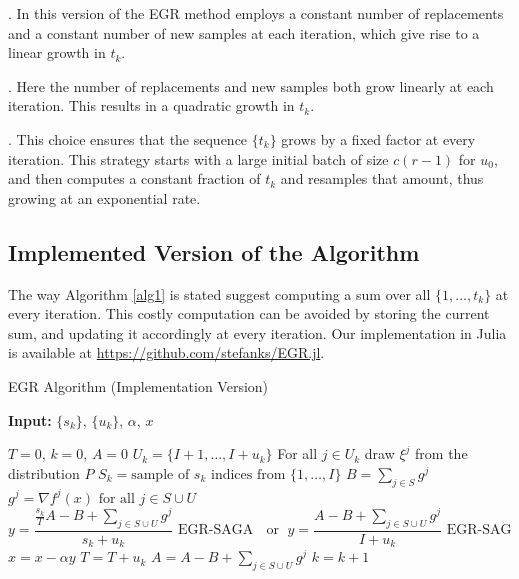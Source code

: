 \documentclass[11pt]{article}
\begin{document}
\medskip{}. In this version of the EGR method employs a constant number of replacements and a constant number of new samples at each iteration, which give rise to a linear growth in $t_k$.

\medskip{}. Here the number of replacements and new samples both grow linearly at each iteration. This results in a  quadratic growth in $t_k$.

\medskip{}. This choice ensures that the sequence $\{ t_k \}$ grows by a fixed factor at every iteration. This strategy starts with a large initial batch of size $c(r-1)$ for $u_0$, and then computes a constant fraction of $t_k$ and resamples that amount, thus growing at an exponential rate. 
 
\subsection{Implemented Version of the Algorithm}

The way Algorithm \ref{alg1} is stated suggest computing a sum over all $\{1, \ldots ,t_k \} $ at every iteration. This costly computation can be avoided by storing the current sum, and updating it accordingly at every iteration. Our implementation in Julia is available at \url{https://github.com/stefanks/EGR.jl}.

  \bigskip
  \begin{algorithm}
  	[H] 
  	\caption{EGR Algorithm (Implementation Version)}
  	\label{alg1-IMP}
  	{\bf Input:} $\{ s_k\} $, $\{ u_k \}$, $\alpha$, $x$
  	\begin{algorithmic}
  		[1] 
  		\State $T= 0$, $k = 0$, $A = 0$
  		\Loop 
  		\State $U_k =\{I+1,\ldots, I+u_k \}$ 
  		\State For  all $j \in U_k$ draw $\xi^j$ from the distribution $P$ 
  		\State $S_k = \mbox{sample of } s_k \mbox{ indices from }\{ 1, \ldots ,I\}$ 
  		\State $B = \sum_{j \in S} g^j$ 
  		\State $g^j =  \nabla f^j(x) \mbox{ for all } j \in S\cup U$ 
  		\State 
  		\begin{equation}
  			y =  \frac{\frac{s_k}{T} A - B +\sum_{j \in S\cup U}g^j}{s_k+u_k} \mbox{ EGR-SAGA } \; \mbox{ or } \; y =  \frac{A - B +\sum_{j \in S\cup U}g^j}{I+u_k} \mbox{ EGR-SAG } 
  		\end{equation}
  		\State $x  =  x - \alpha y$ 
  		\State $T =  T +u_k$ 
  		\State $A  =  A - B+ \sum_{j \in S\cup U}g^j$ 
  		\State $k = k+1$ 
  		\EndLoop 
  	\end{algorithmic}
  \end{algorithm}
  
\end{document}
